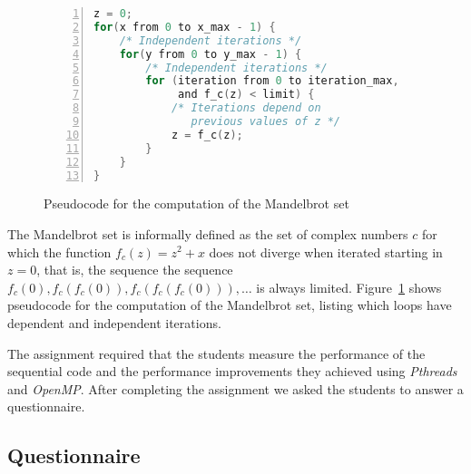\begin{figure}[htb]
\begin{minipage}{\linewidth}
\begin{lstlisting}[language=C, basicstyle=\ttfamily\scriptsize, numbers=left,
                   frame=no, showspaces=false, showstringspaces=false,
                   numberstyle=\tiny,
                   xleftmargin=0.5cm,
                   keywords={%
                       DATATYPE, pthread_t, pthread_create,
                       pthread_join, task_function, NULL, int, main,
                       void, printf, return, pthread_mutex_t,
                       pthread_attr_t, pthread_attr_init,
                       MAX_THREADS, SIZE, char, struct, malloc,
                       MIN, pthread_mutex_lock, pthread_mutex_unlock,
                       pthread_exit, from, to, and%
                       },
                   otherkeywords={::, \#pragma, \#include, <<<,>>>, \&, \*, +, -, /, [, ], >, <}
                   ]
z = 0;
for(x from 0 to x_max - 1) {
    /* Independent iterations */
    for(y from 0 to y_max - 1) {
        /* Independent iterations */
        for (iteration from 0 to iteration_max,
             and f_c(z) < limit) {
            /* Iterations depend on
               previous values of z */
            z = f_c(z);
        }
    }
}
\end{lstlisting}
\end{minipage}
\caption{Pseudocode for the computation of the Mandelbrot set}
\label{lst:mandelbrot-pseudo}
\end{figure}

The Mandelbrot set is informally defined as the set of complex numbers $c$ for
which the function $f_c(z) = z^2 + x$ does not diverge when iterated starting
in $z=0$, that is, the sequence the sequence $f_c(0), f_c(f_c(0)),
f_c(f_c(f_c(0))),\dots$ is always limited. Figure~\ref{lst:mandelbrot-pseudo}
shows pseudocode for the computation of the Mandelbrot set, listing which loops
have dependent and independent iterations.

The assignment required that the students measure the performance of the
sequential code and the performance improvements they achieved using
\textit{Pthreads} and \textit{OpenMP}. After completing the assignment we asked
the students to answer a questionnaire.

\subsection{Questionnaire}

